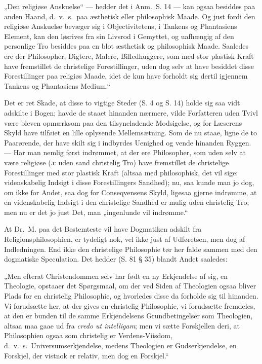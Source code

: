 „Den religiøse Anskuelse“ --- hedder det i Anm.\ S. 14 --- kan
ogsaa besiddes paa anden Haand, d.\ v.\ s.\ paa æsthetisk eller
philosophisk Maade. Og just fordi den religiøse Anskuelse bevæger
sig i Objectivitetens, i Tankens og Phantasiens Element, kan den
løsrives fra sin Livsrod i Gemyttet, og uafhængig af den
personlige Tro
 besiddes paa en blot æsthetisk og philosophisk Maade. Saaledes ere
der Philosopher, Digtere, Malere, Billedhuggere, som med stor
plastisk Kraft have fremstillet de christelige Forestillinger,
uden dog selv at have besiddet disse Forestillinger paa religiøs
Maade, idet de kun have forholdt sig dertil igjennem Tankens og
Phantasiens Medium.“

Det er ret Skade, at disse to vigtige Steder (S. 4 og S. 14) holde
sig saa vidt adskilte i Bogen; havde de staaet hinanden nærmere,
vilde Forfatteren uden Tvivl være bleven opmærksom paa den
tilsyneladende Modsigelse, og for Læserens Skyld have tilføiet en
lille oplysende Mellemsætning. Som de nu staae, ligne de to
Paarørende, der have skilt sig i indbyrdes Uenighed og vende
hinanden Ryggen. --- Har man nemlig først indrømmet, at der ere
Philosopher, som uden selv at være religiøse (ɔ: uden sand
christelig Tro) have fremstillet de christelige Forestillinger med
stor plastisk Kraft (altsaa med philosophisk, det vil sige:
videnskabelig Indsigt i disse Forestillingers Sandhed); nu, saa
kunde man jo dog, om ikke for Andet, saa dog for Conseqvensens
Skyld, ligesaa gjerne indrømme, at en videnskabelig Indsigt i den
christelige Sandhed er mulig uden christelig Tro; men nu er det jo
just Det, man „ingenlunde vil indrømme.“

At Dr.\ M. paa det Bestemteste vil have Dogmatiken adskilt fra
Religionsphilosophien, er tydeligt nok, vel ikke just af
Udføretsen, men dog af Indledningen. End ikke den christelige
Philosophie tør her falde sammen
 med den dogmatiske Speculation. Det hedder (S. 81 § 35) blandt
Andet saaledes:

„Men efterat Christendommen selv har født en ny Erkjendelse af
sig, en Theologie, opstaaer det Spørgsmaal, om der ved Siden af
Theologien ogsaa bliver Plads for en christelig Philosophie, og
hvorledes disse da forholde sig til hinanden. Vi forudsætte her,
at der gives en christelig Philosophie, vi forudsætte fremdeles,
at den er bunden til de samme Erkjendelsens Grundbetingelser som
Theologien, altsaa maa gaae ud fra \textit{credo ut intelligam};
men vi sætte Forskjellen deri, at Philosophien ogsaa som christelig
er Verdens-Viisdom, d.\ v.\ s.\ Universumserkjendelse, medens
Theologien er Gudserkjendelse, en Forskjel, der vistnok er
relativ, men dog en Forskjel.“

